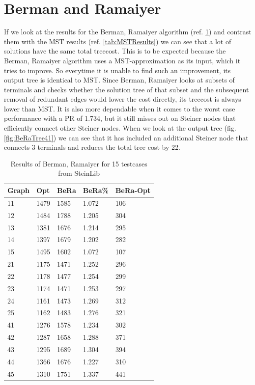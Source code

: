 \section{Berman and Ramaiyer}

If we look at the results for the Berman, Ramaiyer algorithm (ref. \ref{tab:BeRaResults}) and contrast them with the MST results (ref. \ref{tab:MSTResults}) we can see that a lot of solutions have the same total treecost. This is to be expected because the Berman, Ramaiyer algorithm uses a MST-approximation as its input, which it tries to improve. So everytime it is unable to find such an improvement, its output tree is identical to MST. Since Berman, Ramaiyer looks at subsets of terminals and checks whether the solution tree of that subset and the subsequent removal of redundant edges would lower the cost directly, its treecost is always lower than MST. It is also more dependable when it comes to the worst case performance with a PR of 1.734, but it still misses out on Steiner nodes that efficiently connect other Steiner nodes. When we look at the output tree (fig. \ref{fig:BeRaTree41}) we can see that it has included an additional Steiner node that connects 3 terminals and reduces the total tree cost by 22.
\begin{table}[htbp]
 \caption{Results of Berman, Ramaiyer for 15 testcases from SteinLib \cite{Dui93}}\label{tab:BeRaResults} 	
 \centering
 \begin{tabular}{l l l l l}
\toprule
Graph & Opt & BeRa & BeRa\% & BeRa-Opt \\
\midrule
11	& 1479	& 1585	& 1.072	& 106 \\
12	& 1484	& 1788	& 1.205	& 304 \\
13	& 1381	& 1676	& 1.214	& 295 \\
14	& 1397	& 1679	& 1.202	& 282 \\
15	& 1495	& 1602	& 1.072	& 107 \\
\midrule 
21	& 1175	& 1471	& 1.252	& 296 \\
22	& 1178	& 1477	& 1.254	& 299 \\
23	& 1174	& 1471	& 1.253	& 297 \\
24	& 1161	& 1473	& 1.269 	& 312 \\
25	& 1162	& 1483	& 1.276	& 321 \\
\midrule
41	& 1276	& 1578	& 1.234	& 302 \\
42	& 1287	& 1658	& 1.288	& 371 \\
43	& 1295	& 1689	& 1.304	& 394 \\
44	& 1366	& 1676	& 1.227	& 310 \\
45	& 1310	& 1751	& 1.337	& 441 \\
\bottomrule
\end{tabular}
\end{table}

